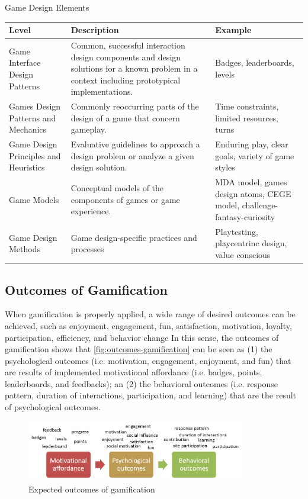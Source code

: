 \begin{quadro}[htbp]
\caption{Game Design Elements}
\label{tab:game-design-elements}
\centering
\begin{tabular}{|p{2.5cm}|p{7cm}|p{3cm}|}
\hline
\textbf{Level} & \textbf{Description} & \textbf{Example} \\ \hline \hline
Game Interface Design Patterns &
Common, successful interaction design components and design solutions for a known problem in a context including prototypical implementations. &
Badges, leaderboards, levels \\ \hline
Games Design Patterns and Mechanics & 
Commonly reoccurring parts of the design of a game that concern gameplay. &
Time constraints, limited resources, turns \\ \hline
Game Design Principles and Heuristics &
Evaluative guidelines to approach a design problem or analyze a given design solution. &
Enduring play, clear goals, variety of game styles \\ \hline
Game Models &
Conceptual models of the components of games or game experience. &
MDA model, games design atoms, CEGE model, challenge-fantasy-curiosity  \\ \hline
Game Design Methods &
Game design-specific practices and processes &
Playtesting, playcentrinc design, value conscious \\ \hline
\end{tabular}
\end{quadro}

\subsection{Outcomes of Gamification}
\label{subsec:outcomes-gamification}

When gamification is properly applied, a wide range of desired outcomes can be achieved, such as enjoyment, engagement, fun, satisfaction, motivation, loyalty, participation, efficiency, and behavior change \cite{HamariKoivistoSarsa2014}
In this sense, the outcomes of gamification shows that \autoref{fig:outcomes-gamification} can be seen as
(1) the psychological outcomes (i.e. motivation, engagement, enjoyment, and fun) that are results of implemented motivational affordance (i.e. badges, points, leaderboards, and feedbacks); an
(2) the behavioral outcomes (i.e. response pattern, duration of interactions, participation, and learning) that are the result of psychological outcomes.

\begin{figure}[htb]
 \caption{Expected outcomes of gamification}
 \label{fig:outcomes-gamification}
 \centering
 \includegraphics[width=0.85\textwidth]{images/chap-general-background/outcomes-gamification.png}
\end{figure}

